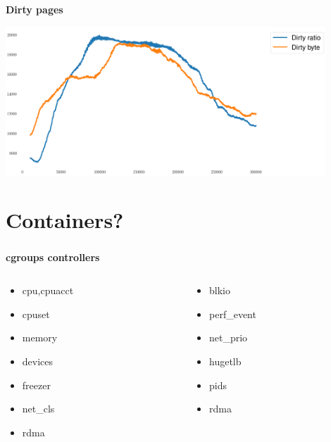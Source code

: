 \documentclass[usenames,dvipsnames, 18pt, compress, aspectratio=169]{beamer}
\begin{document}
\begin{frame}
    \frametitle{}
    \begin{center}
    \textbf{Dirty pages}

    \includegraphics[width=0.9\textwidth,center]{checkpoint_dirty_pages.png}

    \end{center}
\end{frame}

\fontsize{13pt}{14}\selectfont
\section{Containers?}
\fontsize{17pt}{18}\selectfont

\begin{frame}
    \frametitle{}
    \begin{center}
    \textbf{cgroups controllers}

    \begin{columns}
    \begin{column}{0.5\textwidth}
        \begin{itemize}[label={\MVRightarrow}]
            \item cpu,cpuacct
            \item cpuset
            \item memory
            \item devices
            \item freezer
            \item net\_cls
            \item rdma
        \end{itemize}
    \end{column}
    \begin{column}{0.5\textwidth}
        \begin{itemize}[label={\MVRightarrow}]
            \item blkio
            \item perf\_event
            \item net\_prio
            \item hugetlb
            \item pids
            \item rdma
        \end{itemize}
    \end{column}
    \end{columns}

    \end{center}
\end{frame}
\end{document}
